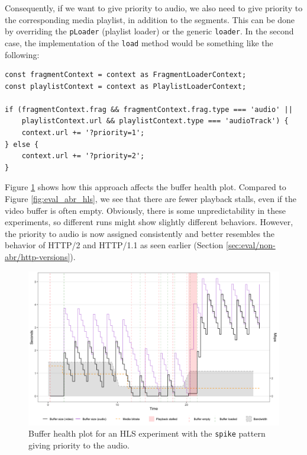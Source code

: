 Consequently, if we want to give priority to audio, we also need to give priority to the corresponding media playlist, in addition to the segments. This can be done by overriding the \texttt{pLoader} (playlist loader) or the generic \texttt{loader}. In the second case, the implementation of the \texttt{load} method would be something like the following:

\begin{verbatim}
const fragmentContext = context as FragmentLoaderContext;
const playlistContext = context as PlaylistLoaderContext;

if (fragmentContext.frag && fragmentContext.frag.type === 'audio' ||
    playlistContext.url && playlistContext.type === 'audioTrack') {
    context.url += '?priority=1';
} else {
    context.url += '?priority=2';
}
\end{verbatim}

Figure \ref{fig:improvements_hls_pri} shows how this approach affects the buffer health plot. Compared to Figure \ref{fig:eval_abr_hls}, we see that there are fewer playback stalls, even if the video buffer is often empty. Obviously, there is some unpredictability in these experiments, so different runs might show slightly different behaviors. However, the priority to audio is now assigned consistently and better resembles the behavior of HTTP/2 and HTTP/1.1 as seen earlier (Section \ref{sec:eval/non-abr/http-versions}).

\begin{figure}[h]
    \centering
    \includegraphics[width=\textwidth]{res/impr_hls_pri.png}
    \caption{Buffer health plot for an HLS experiment with the \texttt{spike} pattern giving priority to the audio.}
    \label{fig:improvements_hls_pri}
\end{figure}

